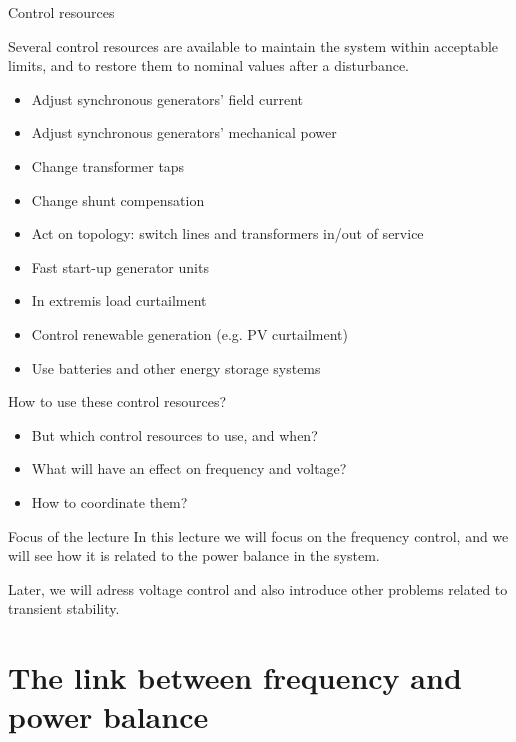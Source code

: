 \begin{frame}{Control resources}

    Several control resources are available to maintain the system within acceptable limits, and to restore them to nominal values after a disturbance.
      \begin{itemize}
          \item Adjust synchronous generators' field current
          \item Adjust synchronous generators' mechanical power
          \item Change transformer taps
          \item Change shunt compensation
          \item Act on topology: switch lines and transformers in/out of service
          \item Fast start-up generator units 
          \item In extremis load curtailment
          \item Control renewable generation (e.g. PV curtailment)
          \item Use batteries and other energy storage systems %
      \end{itemize}
\end{frame}

\begin{frame}{How to use these control resources?}
    \begin{itemize}
      \item But which control resources to use, and when? 
      \item What will have an effect on frequency and voltage? 
      \item How to coordinate them?
    \end{itemize}

    \begin{block}{Focus of the lecture}
      In this lecture we will focus on the frequency control, and we will see how it is related to the power balance in the system.
    \end{block}
    Later, we will adress voltage control and also introduce other problems related to transient stability.
\end{frame}

\section{The link between frequency and power balance}

